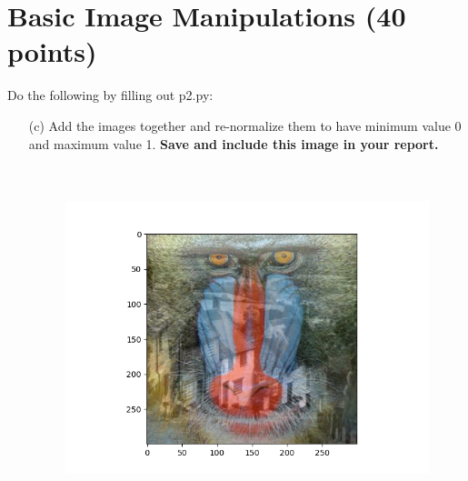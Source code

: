 \documentclass[11pt,oneside,notitlepage]{article}
\begin{document}
\section{Basic Image Manipulations (40 points)}	
Do the following by filling out p2.py:
\begin{itemize}

	\item[(c)]
	Add the images together and re-normalize them to have minimum value 0
	and maximum value 1. \textbf{Save and include this image in your report.}
	\begin{figure}[H]
    \vspace{-0.4cm}
    \begin{center}
        \includegraphics[height=10cm]{ps0_template/p2c.png}
    \end{center}
    \vspace{-1.1cm}
    \end{figure}
    

\end{itemize}
\end{document}
